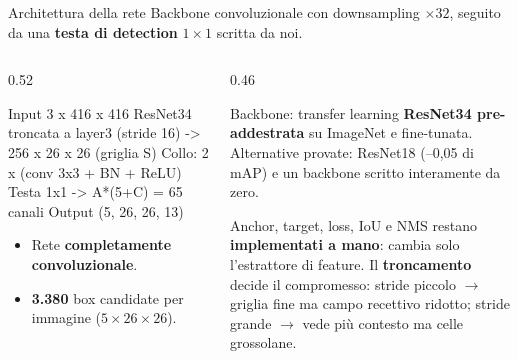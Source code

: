 \documentclass[aspectratio=169]{beamer}
\begin{document}
\begin{frame}[fragile]{Architettura della rete}
  \small
  Backbone convoluzionale con downsampling $\times 32$, seguito da una
  \textbf{testa di detection} $1\times1$ scritta da noi.
  \begin{columns}[T]
    \begin{column}{0.52\textwidth}
      {\footnotesize
      \begin{semiverbatim}
Input  3 x 416 x 416
  ResNet34 troncata a layer3 (stride 16)
             -> 256 x 26 x 26   (griglia S)
  Collo: 2 x (conv 3x3 + BN + ReLU)
  Testa 1x1 -> A*(5+C) = 65 canali
Output (5, 26, 26, 13)
      \end{semiverbatim}}
      \vspace{0.05cm}
      \begin{itemize}
        \item Rete \textbf{completamente convoluzionale}.
        \item \textbf{3.380} box candidate per immagine ($5\times26\times26$).
      \end{itemize}
    \end{column}
    \begin{column}{0.46\textwidth}
      \begin{block}{Backbone: transfer learning}
        \alert{\textbf{ResNet34 pre-addestrata}} su ImageNet e fine-tunata.
        Alternative provate: ResNet18 (--0,05 di mAP) e un backbone scritto
        interamente da zero.
      \end{block}
      {\footnotesize Anchor, target, loss, IoU e NMS restano \textbf{implementati a
      mano}: cambia solo l'estrattore di feature.}
      \vspace{0.08cm}
      {\footnotesize Il \textbf{troncamento} decide il compromesso: stride piccolo
      $\to$ griglia fine ma campo recettivo ridotto; stride grande $\to$ vede più
      contesto ma celle grossolane.}
    \end{column}
  \end{columns}
\end{frame}
\end{document}
